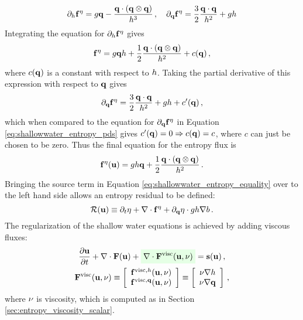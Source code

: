 \begin{equation}\label{eq:shallowwater_entropy_pds}
  \partial_h\mathbf{f}^\eta
  = g\mathbf{q}
  - \frac{\mathbf{q}\cdot\left(\mathbf{q}\otimes\mathbf{q}\right)} 
  {h^3}
  \,,\quad
  \partial_{\mathbf{q}}\mathbf{f}^\eta
  = \frac{3}{2}\frac{\mathbf{q}\cdot\mathbf{q}}{h^2}
  + gh
\end{equation}
Integrating the equation for $\partial_h\mathbf{f}^\eta$
gives
\[
  \mathbf{f}^\eta
  = g\mathbf{q}h
  + \frac{1}{2}\frac{\mathbf{q}\cdot\left(\mathbf{q}\otimes\mathbf{q}\right)} 
  {h^2}
  + c(\mathbf{q}) \,,
\]
where $c(\mathbf{q})$ is a constant with respect to $h$. Taking
the partial derivative of this expression with respect to $\mathbf{q}$
gives
\[
  \partial_{\mathbf{q}}\mathbf{f}^\eta
  = \frac{3}{2}\frac{\mathbf{q}\cdot\mathbf{q}}{h^2}
  + gh + c'(\mathbf{q}) \,,
\]
which when compared to the equation for 
$\partial_{\mathbf{q}}\mathbf{f}^\eta$ in Equation
\eqref{eq:shallowwater_entropy_pds} gives
$c'(\mathbf{q})=0\Rightarrow c(\mathbf{q})=c$, where
$c$ can just be chosen to be zero. Thus the final equation for the
entropy flux is
\begin{equation}
  \mathbf{f}^\eta(\mathbf{u})
  = gh\mathbf{q}
  + \frac{1}{2}\frac{\mathbf{q}\cdot\left(\mathbf{q}\otimes\mathbf{q}\right)} 
  {h^2}
  \,.
\end{equation}
Bringing the source term in Equation \eqref{eq:shallowwater_entropy_equality}
over to the left hand side allows an entropy residual to be defined:
\begin{equation}
  \mathcal{R}(\mathbf{u}) \equiv \partial_t\eta
  + \nabla\cdot\mathbf{f}^\eta
  + \partial_{\mathbf{q}}\eta\cdot gh\nabla b
  \,.
\end{equation}
The regularization of the shallow water equations is achieved by adding
viscous fluxes:
\begin{equation}
\begin{gathered}
  \ppt{\vectorsolution} + \nabla\cdot\consfluxvector
  + \highlightgreen{\nabla\cdot\viscconsfluxvector}
  = \conssource \eqc
\\
  \viscconsfluxvector
  \equiv \left[\begin{array}{c}
    \viscflux{\height}(\vectorsolution,\viscosity)\\
    \viscflux{\heightmomentum}(\vectorsolution,\viscosity)
    \end{array}\right]
  \equiv \left[\begin{array}{c}
    \viscosity\nabla\height\\
    \viscosity\nabla\heightmomentum
    \end{array}\right] \eqc
\end{gathered}
\end{equation}
where $\nu$ is viscosity, which is computed as in Section
\ref{sec:entropy_viscosity_scalar}.
